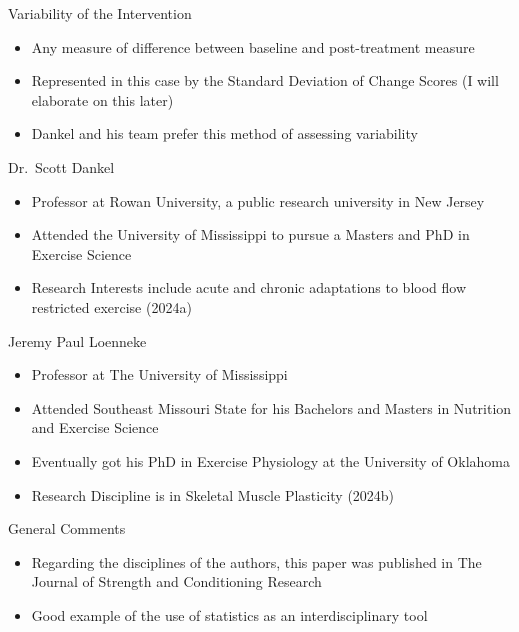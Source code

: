 \documentclass[
  ignorenonframetext,
  aspectratio=169,
]{beamer}
\providecommand{\tightlist}{%
  \setlength{\itemsep}{0pt}\setlength{\parskip}{0pt}}
\begin{document}
\begin{frame}{Variability of the Intervention}
\protect\hypertarget{variability-of-the-intervention}{}
\begin{itemize}
\tightlist
\item
  Any measure of difference between baseline and post-treatment measure
\item
  Represented in this case by the Standard Deviation of Change Scores (I
  will elaborate on this later)
\item
  Dankel and his team prefer this method of assessing variability
\end{itemize}
\end{frame}

\begin{frame}{Dr.~Scott Dankel}
\protect\hypertarget{dr.-scott-dankel}{}
\begin{itemize}
\tightlist
\item
  Professor at Rowan University, a public research university in New
  Jersey
\item
  Attended the University of Mississippi to pursue a Masters and PhD in
  Exercise Science
\item
  Research Interests include acute and chronic adaptations to blood flow
  restricted exercise (2024a)
\end{itemize}
\end{frame}

\begin{frame}{Jeremy Paul Loenneke}
\protect\hypertarget{jeremy-paul-loenneke}{}
\begin{itemize}
\tightlist
\item
  Professor at The University of Mississippi
\item
  Attended Southeast Missouri State for his Bachelors and Masters in
  Nutrition and Exercise Science
\item
  Eventually got his PhD in Exercise Physiology at the University of
  Oklahoma
\item
  Research Discipline is in Skeletal Muscle Plasticity (2024b)
\end{itemize}

\begin{block}{General Comments}
\protect\hypertarget{general-comments}{}
\begin{itemize}
\tightlist
\item
  Regarding the disciplines of the authors, this paper was published in
  The Journal of Strength and Conditioning Research
\item
  Good example of the use of statistics as an interdisciplinary tool
\end{itemize}
\end{block}
\end{frame}
\end{document}

